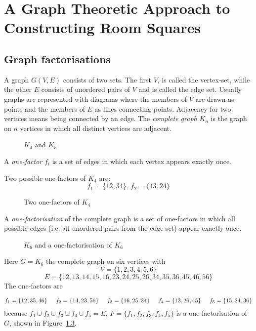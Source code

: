 \chapter{A Graph Theoretic Approach to Constructing Room Squares}

\section{Graph factorisations}

A graph $G(V,E)$ consists of two sets. The first $V$,
is called the vertex-set, while the other $E$ consists
of unordered pairs of $V$ and is called the edge set.
Usually graphs are represented with diagrams where the
members of $V$ are drawn as points and the members of
$E$ as lines connecting points. Adjacency for two vertices
means being connected by an edge. The
\emph{complete graph}
$K_n$ is the graph on $n$ vertices in which all distinct
vertices are adjacent.

\begin{figure}
  \centering
  
  \caption{$K_{4}$ and $K_{5}$}
  \label{fig:complete}
\end{figure}

A
\emph{one-factor}
$f_i$ is a set of edges in which each vertex
appears exactly once.

\begin{example}
Two possible one-factors of $K_4$ are:
$$f_1 = \{12,34\},\, f_2 = \{13,24\}$$
\end{example}

\begin{figure}
  \centering
  
  \caption{Two one-factors of $K_{4}$}
  \label{fig:two-one-factors}
\end{figure}

A
\emph{one-factorisation}
of the complete graph is a set of
one-factors in which all possible edges (i.e. all unordered
pairs from the edge-set) appear exactly once.

\begin{figure}
  \centering
  
  \caption{$K_{6}$ and a one-factorisation of $K_{6}$}
  \label{fig:k6-factorisation}
\end{figure}

\begin{example}
Here
$G = K_6$
the complete graph on six vertices with
$$V = \{1, 2, 3, 4, 5, 6\}$$
$$E = \{12, 13, 14, 15, 16, 23, 24, 25, 26, 34, 35, 36, 45, 46, 56\}$$
The one-factors are

$$
f_1 = \{12, 35, 46\} \hspace{0.5cm}
f_2 = \{14, 23, 56\} \hspace{0.5cm}
f_3 = \{16, 25, 34\} \hspace{0.5cm}
f_4 = \{13, 26, 45\} \hspace{0.5cm} 
f_5 = \{15, 24, 36\}
$$
because
$f_1 \cup f_2 \cup f_3 \cup f_4 \cup f_5 = E$,
$F = \{f_1, f_2, f_3, f_4, f_5\}$
is a one-factorisation of
$G$,
shown in Figure~\ref{fig:k6-factorisation}.
\end{example}

